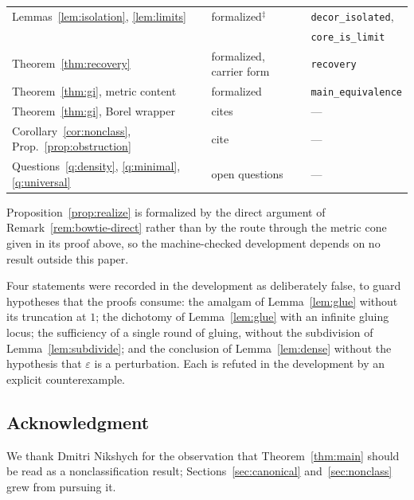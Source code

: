 \documentclass[11pt]{article}
\theoremstyle{definition}
\theoremstyle{remark}
\newcommand{\eps}{\varepsilon}
\begin{document}
\begin{center}
\begin{tabular}{lll}
Lemmas~\ref{lem:isolation}, \ref{lem:limits} & formalized$^{\ddagger}$ & \texttt{decor\_isolated},\\
 & & \texttt{core\_is\_limit}\\
Theorem~\ref{thm:recovery} & formalized, carrier form & \texttt{recovery}\\
Theorem~\ref{thm:gi}, metric content & formalized & \texttt{main\_equivalence}\\
Theorem~\ref{thm:gi}, Borel wrapper & cites \cite{GaoKechris03,Hjorth00} & ---\\
Corollary~\ref{cor:nonclass}, Prop.~\ref{prop:obstruction} & cite \cite{GaoKechris03,Hjorth00} & ---\\
Questions~\ref{q:density}, \ref{q:minimal}, \ref{q:universal} & open questions & ---\\
\end{tabular}
\end{center}

Proposition~\ref{prop:realize} is formalized by the direct argument of
Remark~\ref{rem:bowtie-direct} rather than by the route through the metric cone given in its
proof above, so the machine-checked development depends on no result outside this paper.

Four statements were recorded in the development as deliberately false, to guard hypotheses
that the proofs consume: the amalgam of Lemma~\ref{lem:glue} without its truncation at $1$;
the dichotomy of Lemma~\ref{lem:glue} with an infinite gluing locus; the sufficiency of a
single round of gluing, without the subdivision of Lemma~\ref{lem:subdivide}; and the
conclusion of Lemma~\ref{lem:dense} without the hypothesis that $\eps$ is a perturbation.
Each is refuted in the development by an explicit counterexample.

\subsection*{Acknowledgment}
We thank Dmitri Nikshych for the observation that Theorem~\ref{thm:main} should be read as
a nonclassification result; Sections~\ref{sec:canonical} and~\ref{sec:nonclass} grew from
pursuing it.
\end{document}
